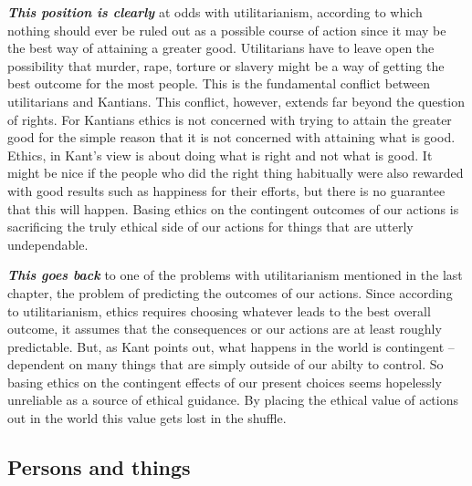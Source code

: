 \documentclass[
  12pt, openany]{book}
\theoremstyle{definition}
\theoremstyle{definition}
\theoremstyle{definition}
\theoremstyle{definition}
\theoremstyle{remark}
\begin{document}
\textbf{\emph{This position is clearly}} at odds with utilitarianism, according to which nothing should ever be ruled out as a possible course of action since it may be the best way of attaining a greater good. Utilitarians have to leave open the possibility that murder, rape, torture or slavery might be a way of getting the best outcome for the most people. This is the fundamental conflict between utilitarians and Kantians. This conflict, however, extends far beyond the question of rights. For Kantians ethics is not concerned with trying to attain the greater good for the simple reason that it is not concerned with attaining what is good. Ethics, in Kant's view is about doing what is right and not what is good. It might be nice if the people who did the right thing habitually were also rewarded with good results such as happiness for their efforts, but there is no guarantee that this will happen. Basing ethics on the contingent outcomes of our actions is sacrificing the truly ethical side of our actions for things that are utterly undependable.

\textbf{\emph{This goes back}} to one of the problems with utilitarianism mentioned in the last chapter, the problem of predicting the outcomes of our actions. Since according to utilitarianism, ethics requires choosing whatever leads to the best overall outcome, it assumes that the consequences or our actions are at least roughly predictable. But, as Kant points out, what happens in the world is contingent -- dependent on many things that are simply outside of our abilty to control. So basing ethics on the contingent effects of our present choices seems hopelessly unreliable as a source of ethical guidance. By placing the ethical value of actions out in the world this value gets lost in the shuffle.

\hypertarget{persons-and-things}{%
\subsection*{Persons and things}\label{persons-and-things}}
\end{document}
